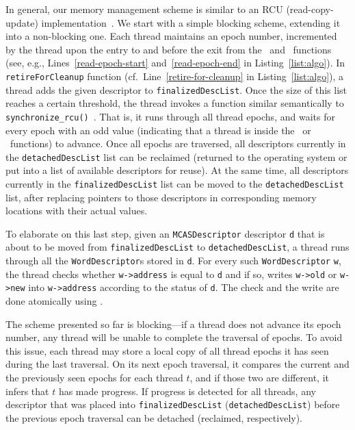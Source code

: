 In general, our memory management scheme is similar to an RCU (read-copy-update) implementation~\cite{McKenney17, MS98}.
We start with a simple blocking scheme, extending it into a non-blocking one.
Each thread maintains an epoch number, incremented by the thread 
upon the entry to and before the exit from the \ttread\ and \mcas\ functions
(see, e.g., Lines~\ref{read-epoch-start} and~\ref{read-epoch-end} in Listing~\ref{list:algo}).
In \texttt{retireForCleanup} function (cf.\ Line~\ref{retire-for-cleanup} in Listing~\ref{list:algo}), a thread adds the given descriptor 
to \texttt{finalizedDescList}.
Once the size of this list reaches a certain threshold, the thread invokes a function similar semantically to \texttt{synchronize\_rcu()}~\cite{McKenney17}.
That is, it runs through all thread epochs, and waits for every epoch with an odd value (indicating that a thread
is inside the \ttread\ or \mcas\ functions) to advance.
Once all epochs are traversed, all descriptors currently in the \texttt{detachedDescList} list can be 
reclaimed (returned to the operating system or put into a list of available descriptors for reuse).
At the same time, all descriptors currently in the \texttt{finalizedDescList} list can be moved
to the \texttt{detachedDescList} list, after replacing pointers to those descriptors in corresponding memory locations with their actual values.

To elaborate on this last step, given an \texttt{MCASDescriptor} descriptor \texttt{d} that is about to be moved 
from \texttt{finalizedDescList} to \texttt{detachedDescList},
a thread runs through all the \texttt{WordDescriptor}s stored in \texttt{d}.
For every such \texttt{WordDescriptor} \texttt{w}, the thread checks whether \texttt{w->address} is equal to \texttt{d} and if so,
writes \texttt{w->old} or \texttt{w->new} into \texttt{w->address} according to the status of \texttt{d}.
The check and the write are done atomically using \cas{}.

The scheme presented so far is blocking---if a thread does not advance its epoch number, any thread will be unable 
to complete the traversal of epochs.
To avoid this issue, each thread may store a local copy of all thread epochs it has seen during the last traversal.
On its next epoch traversal, it compares the current and the previously seen epochs for each thread $t$, and if those
two are different, it infers that $t$ has made progress.
If progress is detected for all threads, 
any descriptor that was placed into \texttt{finalizedDescList} (\texttt{detachedDescList}) before 
the previous epoch traversal can be detached (reclaimed, respectively).

